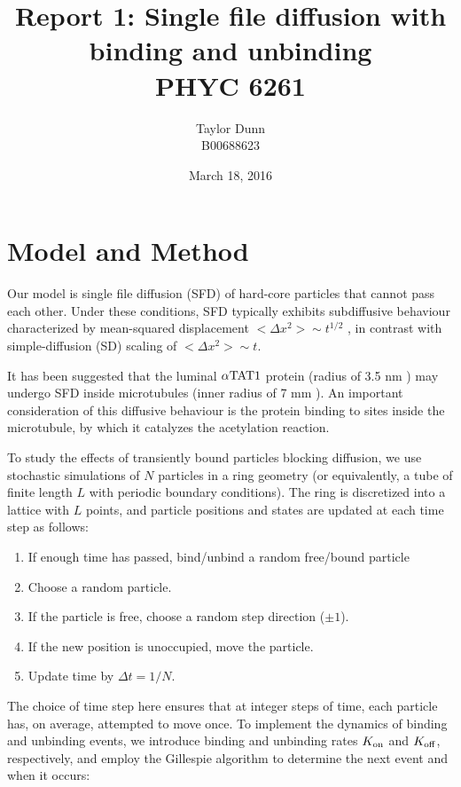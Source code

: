 \documentclass[12pt]{article}
\title{Report 1: Single file diffusion with binding and unbinding \\ PHYC 6261}
\date{March 18, 2016}
\author{Taylor Dunn \\ B00688623}
\begin{document}
\maketitle

\section{Model and Method}

Our model is single file diffusion (SFD) of hard-core particles that cannot pass each other.
Under these conditions, SFD typically exhibits subdiffusive behaviour characterized by mean-squared displacement $<\Delta x^2> \sim t^{1/2}$ \cite{harris1965diffusion}, in contrast with simple-diffusion (SD) scaling of $<\Delta x^2> \sim t$.

It has been suggested that the luminal $\rm \alpha TAT1$ protein (radius of 3.5 nm \cite{montagnac2013agr}) may undergo SFD inside microtubules (inner radius of 7 mm \cite{shida2010major}).
An important consideration of this diffusive behaviour is the protein binding to sites inside the microtubule, by which it catalyzes the acetylation reaction.

To study the effects of transiently bound particles blocking diffusion, we use stochastic simulations of $N$ particles in a ring geometry (or equivalently, a tube of finite length $L$ with periodic boundary conditions).
The ring is discretized into a lattice with $L$ points, and particle positions and states are updated at each time step as follows:

\begin{enumerate}
    \item If enough time has passed, bind/unbind a random free/bound particle
    \item Choose a random particle.
    \item If the particle is free, choose a random step direction ($\pm 1$).
    \item If the new position is unoccupied, move the particle. 
    \item Update time by $\Delta t = 1/N$.
\end{enumerate}

The choice of time step here ensures that at integer steps of time, each particle has, on average, attempted to move once.
To implement the dynamics of binding and unbinding events, we introduce binding and unbinding rates $K_{\rm on}$ and $K_{\rm off}$, respectively, and employ the Gillespie algorithm to determine the next event and when it occurs:
\end{document}
